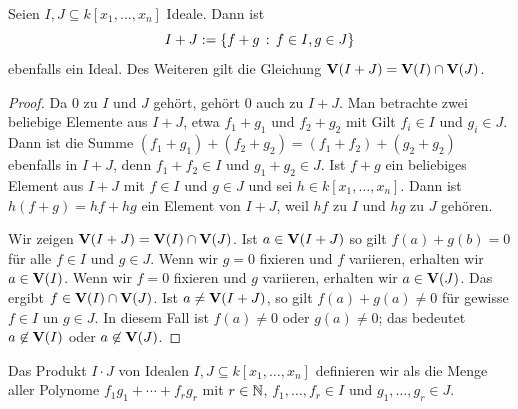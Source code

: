 \documentclass[11pt]{article}
\numberwithin{equation}{section}
\begin{document}
\begin{proposition} 
	Seien $I, J \subseteq k[x_1,\ldots,x_n]$ Ideale. Dann ist 
	\[
		I+ J := \left\{  f+ g \,:\, f \in I, g \in J \right\}
	\] ebenfalls ein Ideal. Des Weiteren gilt die Gleichung $\mathbf{V}(I+J) = \mathbf{V}(I) \cap \mathbf{V}(J)$. 
\end{proposition} 
\begin{proof} 
	Da $0$ zu $I$ und $J$ gehört, gehört $0$ auch zu $I+J$. 
	Man betrachte zwei beliebige Elemente aus $I+J$, etwa $f_1+g_1$ und $f_2+ g_2$ mit 
	Gilt $f_i \in I$ und $g_i \in J$. Dann ist die Summe $(f_1+g_1) + (f_2+g_2) = (f_1+ f_2) + (g_2 + g_2)$ ebenfalls in $I+J$, denn $f_1+f_2 \in I$ und $g_1+g_2 \in J$. Ist $f+g$ ein beliebiges Element aus $I+J$ mit $f \in I$ und $g \in J$ und sei $h \in k[x_1,\ldots,x_n]$. Dann ist $h(f+g) = h f + h g$ ein Element von $I+J$, weil $hf$ zu $I$ und $hg$ zu $J$ gehören. 
	
	Wir zeigen $\mathbf{V}(I+J) = \mathbf{V}(I) \cap \mathbf{V}(J)$. Ist $a \in \mathbf{V}(I+J)$ so gilt $f(a)+ g(b) = 0$ für alle $f \in I$ und $g \in J$. Wenn wir $g=0$ fixieren und $f$ variieren, erhalten wir $a \in \mathbf{V}(I)$. Wenn wir $f=0$ fixieren und $g$ variieren, erhalten wir $a \in \mathbf{V}(J)$. Das ergibt $f \in \mathbf{V}(I) \cap \mathbf{V}(J)$. Ist $a \ne \mathbf{V}(I+J)$, so gilt $f(a) + g(a) \ne 0$ für gewisse $f \in I$ un $g \in J$. In diesem Fall ist $f(a) \ne 0$ oder $g(a) \ne 0$; das bedeutet $a \not \in \mathbf{V}(I)$ oder $a \not\in \mathbf{V}(J)$. 
\end{proof} 

\begin{definition} 
	Das Produkt $I \cdot J$ von Idealen $I, J \subseteq k[x_1,\ldots,x_n]$ definieren wir als die Menge aller Polynome $f_1 g_1 + \cdots + f_r g_r$ mit $r \in \mathbb{N}$, $f_1,\ldots, f_r \in I$ und $g_1,\ldots, g_r \in J$. 
\end{definition} 
\end{document}
